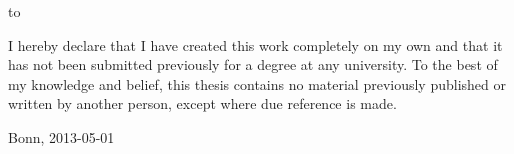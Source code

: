 \thispagestyle{empty}

\vspace*{30\baselineskip}

\hbox to \textwidth{\hrulefill}
\par
I hereby declare that I have created this work completely on my own and that it has not been submitted previously for a degree at any university. To the best of my knowledge and belief, this thesis contains no material previously published or written by another person, except where due reference is made.

\vspace{1cm}
Bonn, 2013-05-01

